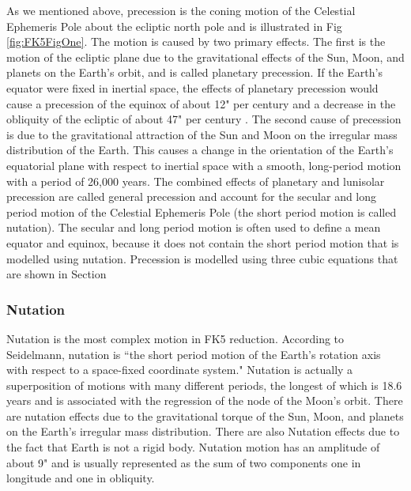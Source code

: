 As we mentioned above, precession is the coning motion of the
Celestial Ephemeris Pole about the ecliptic north pole and is
illustrated in Fig \ref{fig:FK5FigOne}. The motion is caused by two
primary effects. The first is the motion of the ecliptic plane due
to the gravitational effects of the Sun, Moon, and planets on the
Earth's orbit, and is called planetary precession. If the Earth's
equator were fixed in inertial space, the effects of planetary
precession would cause a precession of the equinox of about 12" per
century and a decrease in the obliquity of the ecliptic of about 47"
per century \cite{seidelmann}.  The second cause of precession is
due to the gravitational attraction of the Sun and Moon on the
irregular mass distribution of the Earth. This causes a change in
the orientation of the Earth's equatorial plane with respect to
inertial space with a smooth, long-period motion with a period of
26,000 years.  The combined effects of planetary and lunisolar
precession are called general precession and account for the secular
and long period motion of the Celestial Ephemeris Pole (the short
period motion is called nutation).   The secular and long
period motion is often used to define a mean equator and equinox,
because it does not contain the short period motion that is modelled
using nutation. Precession is modelled using three cubic equations
that are shown in Section %

\subsubsection{Nutation}

Nutation is the most complex motion in FK5 reduction.   According to
Seidelmann\cite{seidelmann}, nutation is ``the short period motion
of the Earth's rotation axis with respect to a space-fixed
coordinate system."  Nutation is actually a superposition of motions
with many different periods, the longest of which is 18.6 years and
is associated with the regression of the node of the Moon's orbit.
There are nutation effects due to the gravitational torque of the
Sun, Moon, and planets on the Earth's irregular mass distribution.
There are also Nutation effects due to the fact that Earth is not a
rigid body.  Nutation motion has an amplitude of about 9" and is
usually represented as the sum of two components one in longitude
and one in obliquity.

\clearpage

